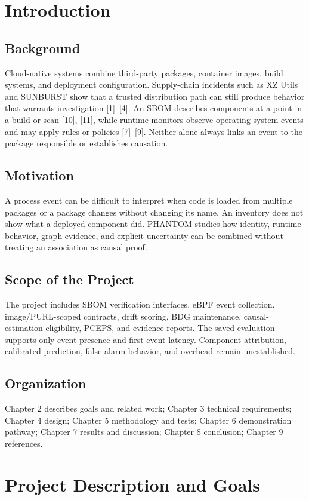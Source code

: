 \documentclass[12pt,a4paper,oneside]{report}
\begin{document}
\chapter{Introduction}
\section{Background}
Cloud-native systems combine third-party packages, container images, build systems, and deployment configuration. Supply-chain incidents such as XZ Utils and SUNBURST show that a trusted distribution path can still produce behavior that warrants investigation [1]--[4]. An SBOM describes components at a point in a build or scan [10], [11], while runtime monitors observe operating-system events and may apply rules or policies [7]--[9]. Neither alone always links an event to the package responsible or establishes causation.
\section{Motivation}
A process event can be difficult to interpret when code is loaded from multiple packages or a package changes without changing its name. An inventory does not show what a deployed component did. PHANTOM studies how identity, runtime behavior, graph evidence, and explicit uncertainty can be combined without treating an association as causal proof.
\section{Scope of the Project}
The project includes SBOM verification interfaces, eBPF event collection, image/PURL-scoped contracts, drift scoring, BDG maintenance, causal-estimation eligibility, PCEPS, and evidence reports. The saved evaluation supports only event presence and first-event latency. Component attribution, calibrated prediction, false-alarm behavior, and overhead remain unestablished.
\section{Organization}
Chapter 2 describes goals and related work; Chapter 3 technical requirements; Chapter 4 design; Chapter 5 methodology and tests; Chapter 6 demonstration pathway; Chapter 7 results and discussion; Chapter 8 conclusion; Chapter 9 references.

\chapter{Project Description and Goals}
\end{document}
